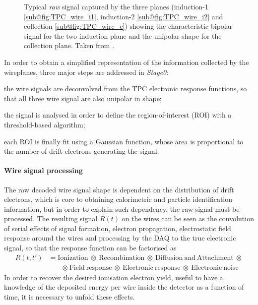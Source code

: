 \begin{figure}
    \centering
    \caption[TPC plane signal]{Typical \emph{raw} signal captured by the three planes (induction-1 \ref{sub@fig:TPC_wire_i1}, induction-2 \ref{sub@fig:TPC_wire_i2} and collection \ref{sub@fig:TPC_wire_c}) showing the characteristic bipolar signal for the two induction plane and the unipolar shape for the collection plane. Taken from \cite{ICARUS:2024hmk}. }
    \label{fig:TPC_signal}
\end{figure}

In order to obtain a simplified representation of the information collected by the wireplanes, three major steps are addressed in \emph{Stage0}: \begin{inparaenum}
    \item the wire signals are deconvolved from the TPC electronic response functions, so that all three wire signal are also unipolar in shape;
    \item the signal is analysed in order to define the region-of-interest (ROI) with a threshold-based algorithm; 
    \item each ROI is finally fit using a Gaussian function, whose area is proportional to the number of drift electrons generating the signal. 
\end{inparaenum}

\paragraph{Wire signal processing} The raw decoded wire signal shape is dependent on the distribution of drift electrons, which is core to obtaining calorimetric and particle identification information, but in order to explain such dependency, the raw signal must be processed. The resulting signal $R(t)$ on the wires can be seen as the convolution of serial effects of signal formation, electron propagation, electrostatic field response around the wires and processing by the DAQ to the true electronic signal, so that the response function can be factorised as \begin{equation}
    \begin{aligned}
        R(t, t')&=\mathrm{Ionization\ \otimes\ Recombination\ \otimes\ Diffusion\ and\ Attachment\ \otimes} \\
        &\quad \quad \mathrm{\otimes\ Field\ response\ \otimes\ Electronic\ response\ \otimes\ Electronic\ noise}
    \end{aligned} 
\end{equation} In order to recover the desired ionisation electron yield, useful to have a knowledge of the deposited energy per wire inside the detector as a function of time, it is necessary to unfold these effects. 

